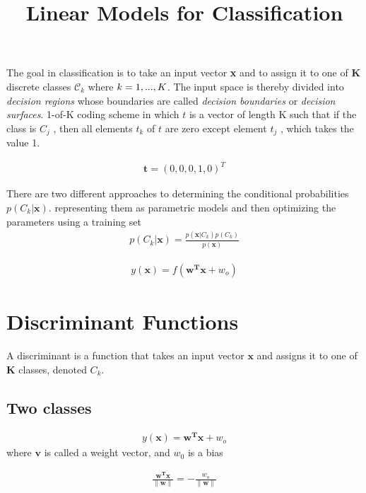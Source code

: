 \documentclass[a4paper]{article}
\begin{document}
\title{Linear Models for Classification}
\author{}
\maketitle

The goal in classification is to take an input vector \textbf{x}
 and to assign it to one of \textbf{K} discrete classes $
 \mathcal{C}_k $ where $ \mathnormal{k} = 1,...,\mathnormal{K} $.
 The input space is thereby divided into \textit{decision regions} whose
 boundaries are called \textit{decision boundaries} or
 \textit{decision surfaces}.
1-of-K coding scheme in which $t$ is a vector of length
 K such that if the class is $C_j$ , then all elements $t_k$ of $t$
 are zero except element $t_j$ , which takes the value 1.

\begin{align}
\mathbf{t} = (0,0,0,1,0)^T
\end{align}

There are two different approaches to determining the conditional probabilities
 $p(C_k|\mathbf{x})$. representing them as parametric models and then
 optimizing the parameters using a training set
\begin{align}
p(C_k|\mathbf{x}) = \frac { p(\mathbf{x}|C_k) p(C_k) }{p(\mathbf{x})}
\end{align}

\begin{align}
y(\mathbf{x}) = f(\mathbf{w^T}\mathbf{x} + w_o)
\end{align}


\section{Discriminant Functions}
A discriminant is a function that takes an input vector $\mathbf{x}$
 and assigns it to one of $\mathbf{K}$ classes, denoted $C_k$.

\subsection{Two classes}

\begin{align}
y(\mathbf{x}) = \mathbf{w^T}\mathbf{x} + w_o
\end{align}
where $\mathbf{v}$ is called a weight vector, and $w_0$ is a bias

\begin{align}
\frac{\mathbf{w^T}\mathbf{x}}{\|\mathbf{w}\|} = -\frac{w_o}{\|\mathbf{w}\|}
\end{align}
\end{document}
